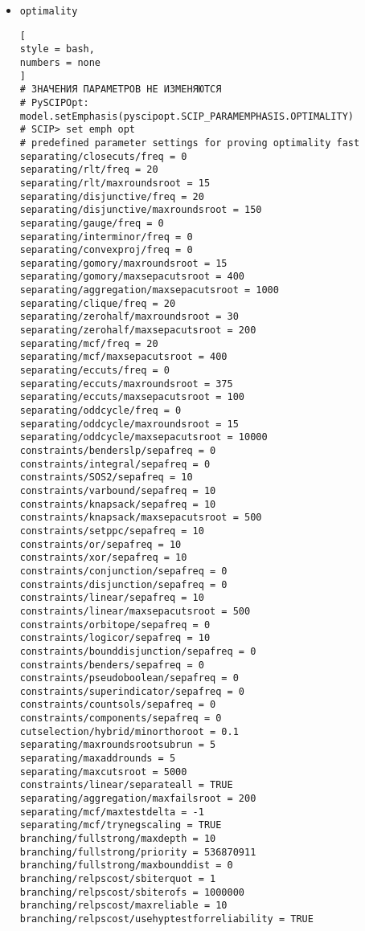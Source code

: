 \documentclass[%
	11pt,
	a4paper,
	utf8,
		]{article}
\begin{document}
\begin{enumerate}
\begin{itemize}
    \item \verb|optimality|
\begin{lstlisting}[
style = bash,
numbers = none
]
# ЗНАЧЕНИЯ ПАРАМЕТРОВ НЕ ИЗМЕНЯЮТСЯ
# PySCIPOpt: model.setEmphasis(pyscipopt.SCIP_PARAMEMPHASIS.OPTIMALITY)
# SCIP> set emph opt
# predefined parameter settings for proving optimality fast
separating/closecuts/freq = 0
separating/rlt/freq = 20
separating/rlt/maxroundsroot = 15
separating/disjunctive/freq = 20
separating/disjunctive/maxroundsroot = 150
separating/gauge/freq = 0
separating/interminor/freq = 0
separating/convexproj/freq = 0
separating/gomory/maxroundsroot = 15
separating/gomory/maxsepacutsroot = 400
separating/aggregation/maxsepacutsroot = 1000
separating/clique/freq = 20
separating/zerohalf/maxroundsroot = 30
separating/zerohalf/maxsepacutsroot = 200
separating/mcf/freq = 20
separating/mcf/maxsepacutsroot = 400
separating/eccuts/freq = 0
separating/eccuts/maxroundsroot = 375
separating/eccuts/maxsepacutsroot = 100
separating/oddcycle/freq = 0
separating/oddcycle/maxroundsroot = 15
separating/oddcycle/maxsepacutsroot = 10000
constraints/benderslp/sepafreq = 0
constraints/integral/sepafreq = 0
constraints/SOS2/sepafreq = 10
constraints/varbound/sepafreq = 10
constraints/knapsack/sepafreq = 10
constraints/knapsack/maxsepacutsroot = 500
constraints/setppc/sepafreq = 10
constraints/or/sepafreq = 10
constraints/xor/sepafreq = 10
constraints/conjunction/sepafreq = 0
constraints/disjunction/sepafreq = 0
constraints/linear/sepafreq = 10
constraints/linear/maxsepacutsroot = 500
constraints/orbitope/sepafreq = 0
constraints/logicor/sepafreq = 10
constraints/bounddisjunction/sepafreq = 0
constraints/benders/sepafreq = 0
constraints/pseudoboolean/sepafreq = 0
constraints/superindicator/sepafreq = 0
constraints/countsols/sepafreq = 0
constraints/components/sepafreq = 0
cutselection/hybrid/minorthoroot = 0.1
separating/maxroundsrootsubrun = 5
separating/maxaddrounds = 5
separating/maxcutsroot = 5000
constraints/linear/separateall = TRUE
separating/aggregation/maxfailsroot = 200
separating/mcf/maxtestdelta = -1
separating/mcf/trynegscaling = TRUE
branching/fullstrong/maxdepth = 10
branching/fullstrong/priority = 536870911
branching/fullstrong/maxbounddist = 0
branching/relpscost/sbiterquot = 1
branching/relpscost/sbiterofs = 1000000
branching/relpscost/maxreliable = 10
branching/relpscost/usehyptestforreliability = TRUE
\end{lstlisting}


\end{itemize}
\end{enumerate}
\end{document}
